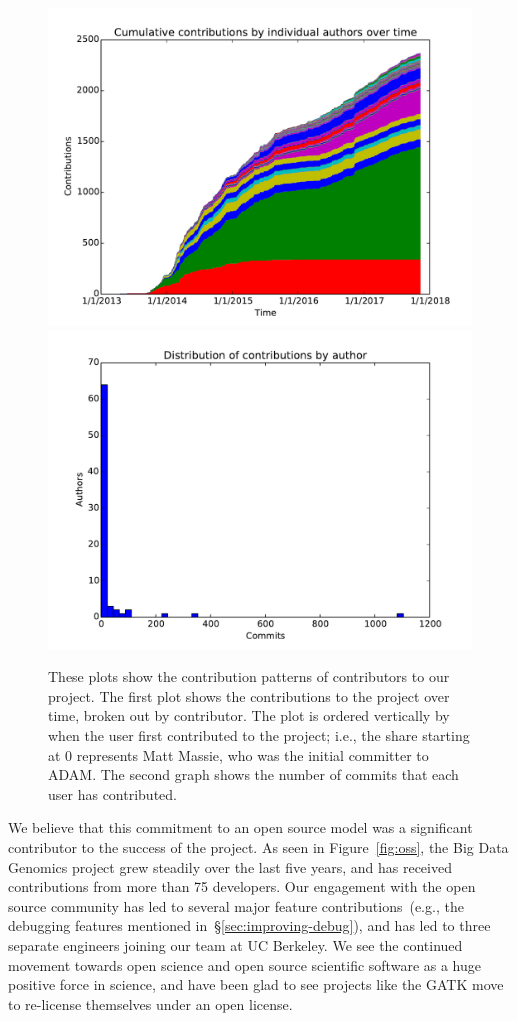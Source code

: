 \documentclass[phd]{ucbthesis}
\begin{document}
\begin{figure}[h]
  \begin{center}
    \includegraphics[width=0.45\linewidth]{graphs/contributions_by_author.pdf}
    \includegraphics[width=0.45\linewidth]{graphs/commit_distribution.pdf}
  \end{center}
  \caption{These plots show the contribution patterns of contributors to our
    project. The first plot shows the contributions to the project over time,
    broken out by contributor. The plot is ordered vertically by when the user
    first contributed to the project; i.e., the share starting at 0 represents
    Matt Massie, who was the initial committer to ADAM. The second graph shows
    the number of commits that each user has contributed.}
  \label{fig:contributors}
\end{figure}

We believe that this commitment to an open source model was a significant
contributor to the success of the project. As seen in Figure~\ref{fig:oss}, the
Big Data Genomics project grew steadily over the last five years, and has
received contributions from more than 75 developers. Our engagement with the
open source community has led to several major feature contributions~(e.g.,
the debugging features mentioned in~\S\ref{sec:improving-debug}), and has led
to three separate engineers joining our team at UC Berkeley. We see the
continued movement towards open science and open source scientific software as
a huge positive force in science, and have been glad to see projects like the
GATK move to re-license themselves under an open license.
\end{document}
